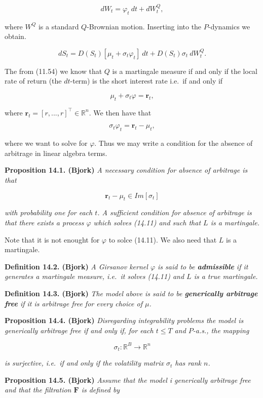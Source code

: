 \documentclass[
]{book}
\begin{document}
\[
dW_t=\varphi_t\ dt+dW_t^Q,\tag{14.7}
\]

where \(W^Q\) is a standard \(Q\)-Brownian motion. Inserting into the \(P\)-dynamics we obtain.

\[
dS_t=D(S_t)[\mu_t+\sigma_t\varphi_t]\ dt+D(S_t)\sigma_t\ dW_t^Q.\tag{14.8}
\]

The from (11.54) we know that \(Q\) is a martingale measure if and only if the local rate of return (the \(dt\)-term) is the short interest rate i.e.~if and only if

\[
\mu_t+\sigma_t\varphi=\mathbf{r}_t,\tag{14.9}
\]

where \(\mathbf{r}_t=[r,...,r]^\top\in\mathbb{R}^n\). We then have that

\[
\sigma_t\varphi_t = \mathbf{r}_t-\mu_t,\tag{14.11}
\]

where we want to solve for \(\varphi\). Thus we may write a condition for the absence of arbitrage in linear algebra terms.

\textbf{Proposition 14.1. (Bjork)} \emph{A necessary condition for absence of arbitrage is that}

\[
\mathbf{r}_t-\mu_t\in Im[\sigma_t]
\]

\emph{with probability one for each \(t\). A sufficient condition for absence of arbitrage is that there exists a process \(\varphi\) which solves (14.11) and such that \(L\) is a martingale.}

Note that it is not enought for \(\varphi\) to solce (14.11). We also need that \(L\) is a martingale.

\textbf{Definition 14.2. (Bjork)} \emph{A Girsanov kernel \(\varphi\) is said to be \textbf{admissible} if it generates a martingale measure, i.e.~it solves (14.11) and \(L\) is a true martingale.}

\textbf{Definition 14.3. (Bjork)} \emph{The model above is said to be \textbf{generically arbitrage free} if it is arbitrage free for every choice of \(\mu\).}

\textbf{Proposition 14.4. (Bjork)} \emph{Disregarding integrability problems the model is generically arbitrage free if and only if, for each \(t\le T\) and \(P\)-a.s., the mapping}

\[
\sigma_t : \mathbb{R}^B\to \mathbb{R}^n
\]

\emph{is surjective, i.e.~if and only if the volatility matrix \(\sigma_t\) has rank \(n\).}

\textbf{Proposition 14.5. (Bjork)} \emph{Assume that the model i generically arbitrage free and that the filtration \(\mathbf{F}\) is defined by}
\end{document}
